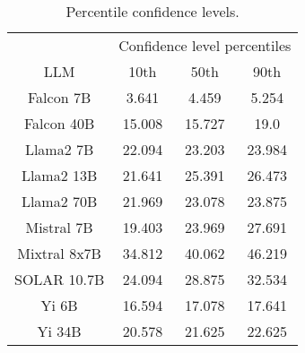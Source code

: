 \begin{table*}
\centering
\begin{tabular}{c|c|c|c}
& \multicolumn{3}{c}{Confidence level percentiles} \\ 
LLM & 10th & 50th & 90th\\ \hline
Falcon 7B & 3.641 & 4.459 & 5.254\\
Falcon 40B & 15.008 & 15.727 & 19.0\\
Llama2 7B & 22.094 & 23.203 & 23.984\\
Llama2 13B & 21.641 & 25.391 & 26.473\\
Llama2 70B & 21.969 & 23.078 & 23.875\\
Mistral 7B & 19.403 & 23.969 & 27.691\\
Mixtral 8x7B & 34.812 & 40.062 & 46.219\\
SOLAR 10.7B & 24.094 & 28.875 & 32.534\\
Yi 6B & 16.594 & 17.078 & 17.641\\
Yi 34B & 20.578 & 21.625 & 22.625\\
\hline
\end{tabular}
\caption{Percentile confidence levels.}
\label{tab:percentile_conf}
\end{table*}

